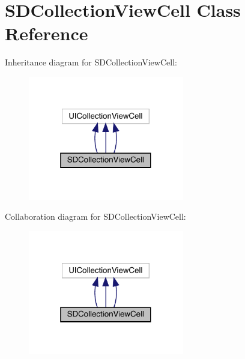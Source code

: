 \hypertarget{interface_s_d_collection_view_cell}{}\section{S\+D\+Collection\+View\+Cell Class Reference}
\label{interface_s_d_collection_view_cell}


Inheritance diagram for S\+D\+Collection\+View\+Cell\+:\nopagebreak
\begin{figure}[H]
\begin{center}
\leavevmode
\includegraphics[width=193pt]{interface_s_d_collection_view_cell__inherit__graph}
\end{center}
\end{figure}


Collaboration diagram for S\+D\+Collection\+View\+Cell\+:\nopagebreak
\begin{figure}[H]
\begin{center}
\leavevmode
\includegraphics[width=193pt]{interface_s_d_collection_view_cell__coll__graph}
\end{center}
\end{figure}
